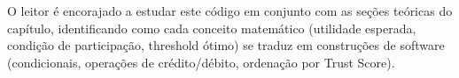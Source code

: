 O leitor é encorajado a estudar este código em conjunto com as seções teóricas do capítulo, identificando como cada conceito matemático (utilidade esperada, condição de participação, threshold ótimo) se traduz em construções de software (condicionais, operações de crédito/débito, ordenação por Trust Score).

